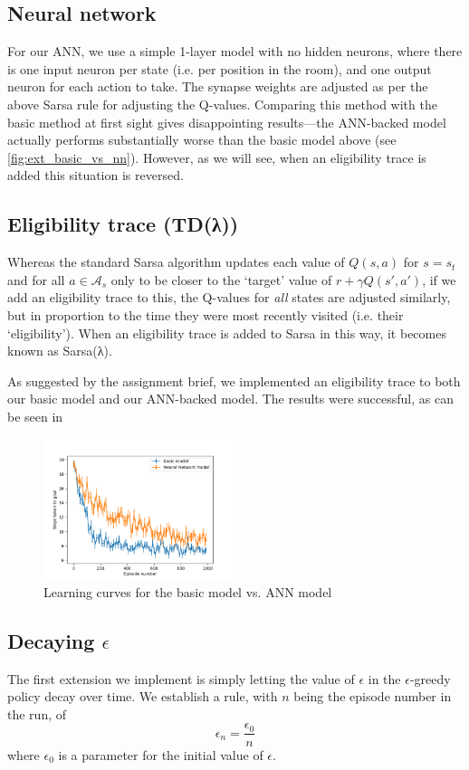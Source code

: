 \documentclass[a4paper, 11pt, twocolumn, final]{article} %
\begin{document}
\subsection{Neural network} \label{sec:ext_nn} For our ANN, we use a simple
1-layer model with no hidden neurons, where there is one input neuron per state
(i.e. per position in the room), and one output neuron for each action to take.
The synapse weights are adjusted as per the above Sarsa rule for adjusting the
Q-values.  Comparing this method with the basic method at first sight gives
disappointing results---the ANN-backed model actually performs substantially
worse than the basic model above (see \autoref{fig:ext_basic_vs_nn}).  However,
as we will see, when an eligibility trace is added this situation is reversed.

\subsection{Eligibility trace (TD(λ))} Whereas the standard Sarsa algorithm
updates each value of $Q(s, a)$ for $s = s_t$ and for all $a \in \mathcal{A}_s$
only to be closer to the `target' value of $r + \gamma Q(s', a')$, if we add an
eligibility trace to this, the Q-values for \textit{all} states are adjusted
similarly, but in proportion to the time they were most recently visited (i.e.
their `eligibility').  When an eligibility trace is added to Sarsa in this way,
it becomes known as Sarsa(λ).

As suggested by the assignment brief, we implemented an eligibility trace to
both our basic model and our ANN-backed model.  The results were successful, as
can be seen in

\begin{figure}
  \includegraphics[width=0.49\textwidth]{figures/basic_vs_nn.png}
  \caption{Learning curves for the basic model vs. ANN model}
  \label{fig:ext_basic_vs_nn}
\end{figure}

\subsection{Decaying $\epsilon$} The first extension we implement is simply
letting the value of $\epsilon$ in the $\epsilon$-greedy policy decay over time.
We establish a rule, with $n$ being the episode number in the run, of
\begin{equation}
  \epsilon_n = \frac{\epsilon_0}{n}
\end{equation}
where $\epsilon_0$ is a parameter for the initial value of $\epsilon$.
\end{document}

